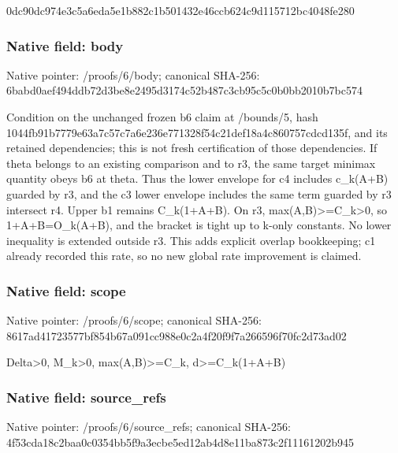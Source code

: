 \documentclass[10pt,a4paper]{article}
\begin{document}
\begingroup\raggedright\sloppy 0dc90dc974e3c5a6eda5e1b882c1b501432e46ccb624c9d115712bc4048fe280\par\endgroup

\subsubsection{Native field: body}
Native pointer: /proofs/6/body; canonical SHA-256: 6babd0aef494ddb72d3be8e2495d3174c52b487c3cb95c5c0b0bb2010b7bc574

\begingroup\raggedright\sloppy Condition on the unchanged frozen b6 claim at /\allowbreak{}bounds/\allowbreak{}5,\allowbreak{} hash 1044fb91b7779e63a7c57c7a6e236e771328f54c21def18a4c860757cdcd135f,\allowbreak{} and its retained dependencies;\allowbreak{} this is not fresh certification of those dependencies. If theta belongs to an existing comparison and to r3,\allowbreak{} the same target minimax quantity obeys b6 at theta. Thus the lower envelope for c4 includes c\_\allowbreak{}k(A+B) guarded by r3,\allowbreak{} and the c3 lower envelope includes the same term guarded by r3 intersect r4. Upper b1 remains C\_\allowbreak{}k(1+A+B). On r3,\allowbreak{} max(A,\allowbreak{}B)>=\allowbreak{}C\_\allowbreak{}k>0,\allowbreak{} so 1+A+B=\allowbreak{}O\_\allowbreak{}k(A+B),\allowbreak{} and the bracket is tight up to k-only constants. No lower inequality is extended outside r3. This adds explicit overlap bookkeeping;\allowbreak{} c1 already recorded this rate,\allowbreak{} so no new global rate improvement is claimed.\par\endgroup

\subsubsection{Native field: scope}
Native pointer: /proofs/6/scope; canonical SHA-256: 8617ad41723577bf854b67a091cc988e0c2a4f20f9f7a266596f70fc2d73ad02

\begingroup\raggedright\sloppy Delta>0,\allowbreak{} M\_\allowbreak{}k>0,\allowbreak{} max(A,\allowbreak{}B)>=\allowbreak{}C\_\allowbreak{}k,\allowbreak{} d>=\allowbreak{}C\_\allowbreak{}k(1+A+B)\par\endgroup

\subsubsection{Native field: source\_\allowbreak{}refs}
Native pointer: /proofs/6/source\_\allowbreak{}refs; canonical SHA-256: 4f53cda18c2baa0c0354bb5f9a3ecbe5ed12ab4d8e11ba873c2f11161202b945
\end{document}
